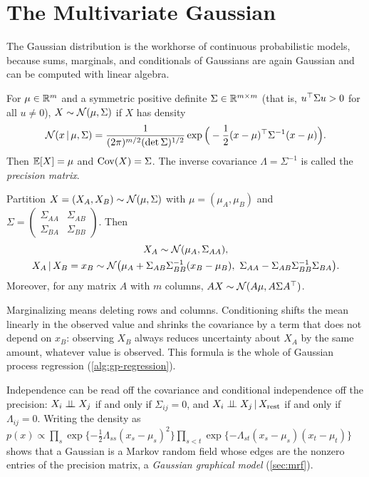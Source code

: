 \section{The Multivariate Gaussian}\label{sec:gaussian}

The Gaussian distribution is the workhorse of continuous probabilistic models, because sums, marginals, and conditionals of Gaussians are again Gaussian and can be computed with linear algebra.

\begin{definition}\label{def:gaussian}
For $\mu\in\mathbb{R}^m$ and a symmetric positive definite $\Sigma\in\mathbb{R}^{m\times m}$ (that is, $u^{\top}\Sigma u>0$ for all $u\ne0$), $X\sim\mathcal{N}(\mu,\Sigma)$ if $X$ has density
\[
\mathcal{N}(x\,|\,\mu,\Sigma)=\frac{1}{(2\pi)^{m/2}(\det\Sigma)^{1/2}}\exp\Big(-\frac12(x-\mu)^{\top}\Sigma^{-1}(x-\mu)\Big).
\]
Then $\mathbb{E}[X]=\mu$ and $\operatorname{Cov}(X)=\Sigma$. The inverse covariance $\Lambda=\Sigma^{-1}$ is called the \emph{precision matrix}.
\end{definition}

\begin{proposition}\label{prop:gauss-cond}
Partition $X=(X_A,X_B)\sim\mathcal{N}(\mu,\Sigma)$ with $\mu=(\mu_A,\mu_B)$ and
$\Sigma=\begin{pmatrix}\Sigma_{AA}&\Sigma_{AB}\\\Sigma_{BA}&\Sigma_{BB}\end{pmatrix}$. Then
\begin{gather*}
X_A\sim\cN(\mu_A,\Sigma_{AA}),\\
X_A\given X_B=x_B\sim\cN\big(\mu_A+\Sigma_{AB}\Sigma_{BB}^{-1}(x_B-\mu_B),\ \Sigma_{AA}-\Sigma_{AB}\Sigma_{BB}^{-1}\Sigma_{BA}\big).
\end{gather*}
Moreover, for any matrix $A$ with $m$ columns, $AX\sim\mathcal{N}(A\mu,A\Sigma A^{\top})$.
\end{proposition}

Marginalizing means deleting rows and columns. Conditioning shifts the mean linearly in the observed value and shrinks the covariance by a term that does not depend on $x_B$: observing $X_B$ always reduces uncertainty about $X_A$ by the same amount, whatever value is observed. This formula is the whole of Gaussian process regression (\cref{alg:gp-regression}).

Independence can be read off the covariance and conditional independence off the precision: $X_i\perp\!\!\!\perp X_j$ if and only if $\Sigma_{ij}=0$, and $X_i\perp\!\!\!\perp X_j\,|\, X_{\text{rest}}$ if and only if $\Lambda_{ij}=0$. Writing the density as $p(x)\propto\prod_s\exp\{-\frac12\Lambda_{ss}(x_s-\mu_s)^2\}\prod_{s<t}\exp\{-\Lambda_{st}(x_s-\mu_s)(x_t-\mu_t)\}$ shows that a Gaussian is a Markov random field whose edges are the nonzero entries of the precision matrix, a \emph{Gaussian graphical model} (\cref{sec:mrf}).

